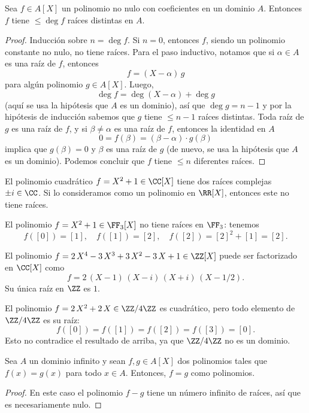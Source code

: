 \begin{corolario}
  \label{prop:numero-de-raices-de-un-polinomio}
  Sea $f\in A [X]$ un polinomio no nulo con coeficientes en un dominio
  $A$. Entonces $f$ tiene $\le \deg f$ raíces distintas en $A$.

  \begin{proof}
    Inducción sobre $n = \deg f$. Si $n = 0$, entonces $f$, siendo un polinomio
    constante no nulo, no tiene raíces. Para el paso inductivo, notamos que si
    $\alpha\in A$ es una raíz de $f$, entonces
    $$f = (X-\alpha)\,g$$
    para algún polinomio $g\in A [X]$. Luego,
    $$\deg f = \deg (X-\alpha) + \deg g$$
    (aquí se usa la hipótesis que $A$ es un dominio), así que $\deg g = n - 1$ y
    por la hipótesis de inducción sabemos que $g$ tiene $\le n - 1$ raíces
    distintas. Toda raíz de $g$ es una raíz de $f$, y si $\beta \ne \alpha$ es
    una raíz de $f$, entonces la identidad en $A$
    $$0 = f (\beta) = (\beta-\alpha)\cdot g (\beta)$$
    implica que $g (\beta) = 0$ y $\beta$ es una raíz de $g$ (de nuevo, se usa
    la hipótesis que $A$ es un dominio). Podemos concluir que $f$ tiene $\le n$
    diferentes raíces.
  \end{proof}
\end{corolario}

\begin{ejemplo}
  El polinomio cuadrático $f = X^2 + 1 \in \CC [X]$ tiene dos raíces complejas
  $\pm i\in \CC$. Si lo consideramos como un polinomio en $\RR [X]$, entonces
  este no tiene raíces.

  El polinomio $f = X^2 + 1 \in \FF_3 [X]$ no tiene raíces en $\FF_3$: tenemos
  $$f ([0]) = [1], \quad f ([1]) = [2], \quad f ([2]) = [2]^2 + [1] = [2].$$

  El polinomio $f = 2\,X^4 - 3\,X^3 + 3\,X^2 - 3\,X + 1 \in \ZZ [X]$
  puede ser factorizado en $\CC [X]$ como
  $$f = 2\,(X-1)\,(X-i)\,(X+i)\,(X-1/2).$$
  Su única raíz en $\ZZ$ es $1$.

  El polinomio $f = 2\,X^2 + 2\,X \in \ZZ/4\ZZ$ es cuadrático, pero todo
  elemento de $\ZZ/4\ZZ$ es su raíz:
  $$f ([0]) = f ([1]) = f ([2]) = f ([3]) = [0].$$
  Esto no contradice el resultado de arriba, ya que $\ZZ/4\ZZ$ no es un dominio.
\end{ejemplo}

\begin{corolario}
  Sea $A$ un dominio infinito y sean $f, g \in A [X]$ dos polinomios tales que
  $f (x) = g (x)$ para todo $x\in A$. Entonces, $f = g$ como polinomios.

  \begin{proof}
    En este caso el polinomio $f - g$ tiene un número infinito de raíces, así
    que es necesariamente nulo.
  \end{proof}
\end{corolario}

